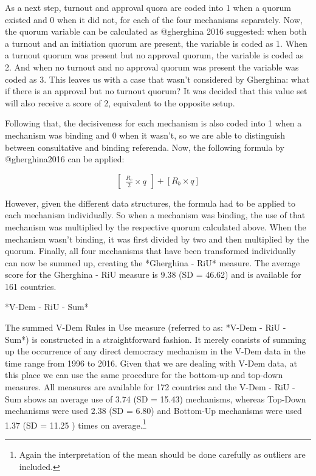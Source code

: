 \documentclass{systats}
\begin{document}
As a next step, turnout and approval quora are coded into 1 when a quorum existed and 0 when it did not, for each of the four mechanisms separately. Now, the quorum variable can be calculated as @gherghina 2016 suggested: when both a turnout and an initiation quorum are present, the variable is coded as 1. When a turnout quorum was present but no approval quorum, the variable is coded as 2. And when no turnout and no approval quorum was present the variable was coded as 3. This leaves us with a case that wasn’t considered by Gherghina: what if there is an approval but no turnout quorum? It was decided that this value set will also receive a score of 2, equivalent to the opposite setup. 

Following that, the decisiveness for each mechanism is also coded into 1 when a mechanism was binding and 0 when it wasn’t, so we are able to distinguish between consultative and binding referenda. Now, the following formula by @gherghina2016 can be applied:

$$\begin{bmatrix}
	\frac{R_c}{2} \times q
\end{bmatrix} + [R_b \times q]$$

However, given the different data structures, the formula had to be applied to each mechanism individually. So when a mechanism was binding, the use of that mechanism was multiplied by the respective quorum calculated above. When the mechanism wasn’t binding, it was first divided by two and then multiplied by the quorum. Finally, all four mechanisms that have been transformed individually can now be summed up, creating the *Gherghina - RiU* measure. The average score for the Gherghina - RiU measure is 9.38 (SD = 46.62) and is available for 161 countries.

*V-Dem - RiU - Sum*

The summed V-Dem Rules in Use measure (referred to as: *V-Dem - RiU - Sum*) is constructed in a straightforward fashion. It merely consists of summing up the occurrence of any direct democracy mechanism in the V-Dem data in the time range from 1996 to 2016. Given that we are dealing with V-Dem data, at this place we can use the same procedure for the bottom-up and top-down measures. All measures are available for 172 countries and the V-Dem - RiU - Sum shows an average use of 3.74 (SD = 15.43) mechanisms, whereas Top-Down mechanisms were used 2.38 (SD = 6.80) and Bottom-Up mechanisms were used 1.37 (SD = 11.25 ) times on average.\footnote{Again the interpretation of the mean should be done carefully as outliers are included.}
\end{document}
